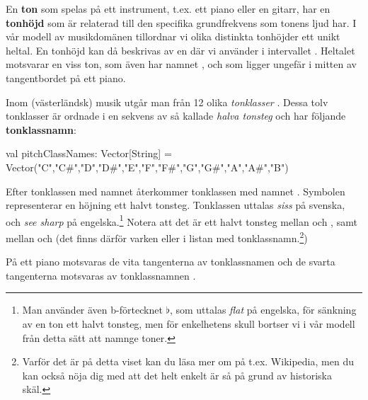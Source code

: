 En \textbf{ton}  som spelas på ett instrument, t.ex. ett piano eller en gitarr, har en \textbf{tonhöjd}  som är relaterad till den specifika  grundfrekvens som tonens ljud har. I vår modell av musikdomänen tillordnar vi olika distinkta tonhöjder ett unikt heltal. En tonhöjd kan då beskrivas av en  där vi använder  i intervallet . Heltalet  motsvarar en viss ton, som även har namnet  , och som ligger ungefär i mitten av tangentbordet på ett piano.

Inom (västerländsk) musik utgår man från 12 olika \emph{tonklasser} .
Dessa tolv tonklasser är ordnade i en sekvens av så kallade \emph{halva tonsteg} och har följande \textbf{tonklassnamn}:
\begin{Code}
  val pitchClassNames: Vector[String] =
    Vector("C","C#","D","D#","E","F","F#","G","G#","A","A#","B")
\end{Code}
Efter tonklassen med namnet  återkommer tonklassen med namnet .
Symbolen \code{#} representerar en höjning ett halvt tonsteg. Tonklassen  uttalas \emph{siss} på svenska, och \emph{see sharp} på engelska.\footnote{Man använder även b-förtecknet $\flat$, som uttalas \emph{flat} på engelska, för sänkning av en ton ett halvt tonsteg, men för enkelhetens skull bortser vi i vår modell från detta sätt att namnge toner.}
 Notera att det är ett halvt tonsteg mellan  och , samt mellan  och  (det finns därför varken  eller  i listan med tonklassnamn.\footnote{Varför det är på detta viset kan du läsa mer om på t.ex. Wikipedia, men du kan också nöja dig med att det helt enkelt är så på grund av historiska skäl.})

På ett piano motsvaras de vita tangenterna av tonklassnamen  och de svarta tangenterna motsvaras av tonklassnamnen .

